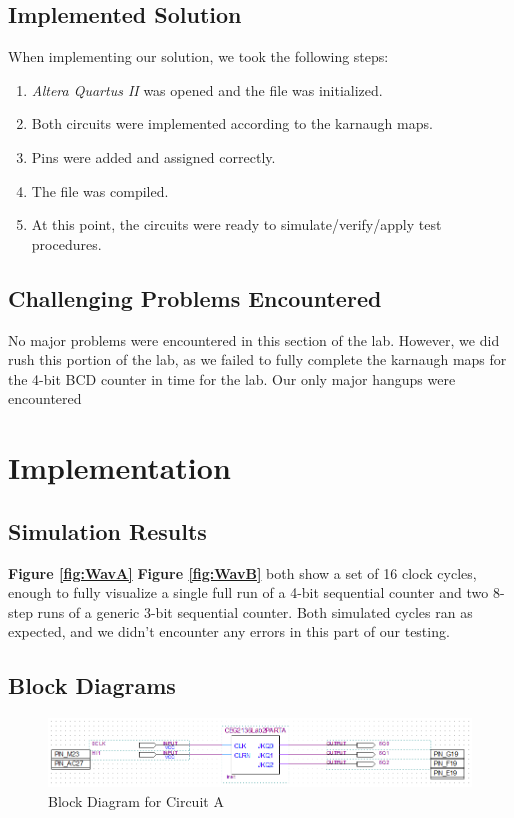 \documentclass[a4paper,12pt]{article}
\begin{document}
\subsection{Implemented Solution}
When implementing our solution, we took the following steps:
\begin{enumerate}
\item \textit{Altera Quartus II} was opened and the file was initialized.
\item Both circuits were implemented according to the karnaugh maps.
\item Pins were added and assigned correctly.
\item The file was compiled.
\item At this point, the circuits were ready to simulate/verify/apply test procedures.
\end{enumerate}
\subsection{Challenging Problems Encountered}
No major problems were encountered in this section of the lab. However, we did rush this portion of the lab, as we failed to fully complete the karnaugh maps for the 4-bit BCD counter in time for the lab. Our only major hangups were encountered 




\section{Implementation}

\subsection{Simulation Results}
\textbf{Figure \ref{fig:WavA}} \textbf{Figure \ref{fig:WavB}} both show a set of 16 clock cycles, enough to fully visualize a single full run of a 4-bit sequential counter and two 8-step runs of a generic 3-bit sequential counter. Both simulated cycles ran as expected, and we didn't encounter any errors in this part of our testing.

\subsection{Block Diagrams}

\begin{figure}[H]
\includegraphics[width=\textwidth]{Images/LAB2_TestA.PNG} 
\caption{Block Diagram for Circuit A}
\label{fig:BlockDiagA}
\end{figure}
\end{document}
